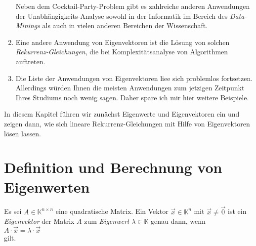 \begin{enumerate}
      Neben dem Cocktail-Party-Problem gibt es zahlreiche anderen Anwendungen der
      Unabh\"angigkeits-Analyse sowohl in der Informatik im Bereich des 
      {\emph{\color{blue}Data-Minings}} als auch in vielen anderen Bereichen der Wissenschaft.
\item Eine andere Anwendung von Eigenvektoren ist die L\"osung von
      solchen {\emph{\color{blue}Rekurrenz-Gleichungen}}, die bei Komplexit\"atsanalyse von Algorithmen auftreten.
\item Die Liste der Anwendungen von Eigenvektoren lie\3e sich problemlos fortsetzen.  Allerdings
      w\"urden Ihnen die meisten Anwendungen zum jetzigen Zeitpunkt Ihres Studiums noch wenig sagen.
      Daher spare ich mir hier weitere Beispiele.
\end{enumerate}
In diesem Kapitel f\"uhren wir zun\"achst Eigenwerte und Eigenvektoren ein und zeigen dann, wie sich 
lineare Rekurrenz-Gleichungen mit Hilfe von Eigenvektoren l\"osen lassen.  
\pagebreak

\section{Definition und Berechnung von Eigenwerten}
\begin{Definition}[Eigenwert]
Es sei $A \in \mathbb{K}^{n \times n}$ eine quadratische Matrix.  Ein Vektor $\vec{x} \in \mathbb{K}^n$ mit $\vec{x} \not=\vec{0}$
ist ein {\emph{\color{blue}Eigenvektor}} der Matrix $A$ zum {\emph{\color{blue}Eigenwert}} $\lambda \in \mathbb{K}$ genau dann, wenn  
\\[0.2cm]
\hspace*{1.3cm}
$A \cdot \vec{x} = \lambda \cdot \vec{x}$
\\[0.2cm]
gilt.  \eoxs
\end{Definition}

